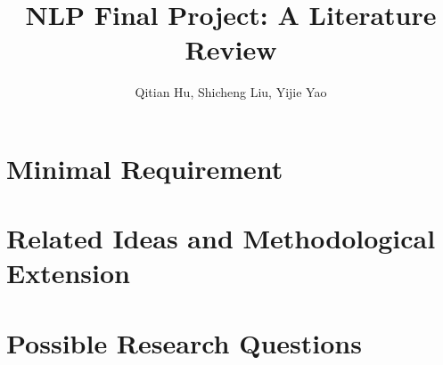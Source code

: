 \documentclass{article}
\title{NLP Final Project: A Literature Review}
\author{Qitian Hu, Shicheng Liu, Yijie Yao}
\begin{document}
\maketitle 

\section{Minimal Requirement}


\section{Related Ideas and Methodological Extension}




\section{Possible Research Questions}









\end{document}
